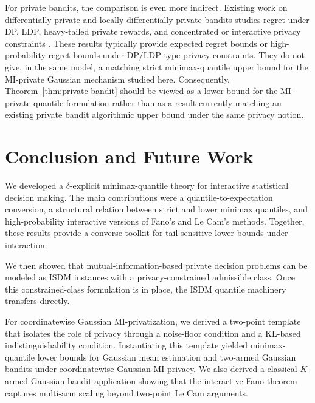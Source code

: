 \documentclass[journal]{IEEEtran}
\begin{document}
For private bandits, the comparison is even more indirect. Existing work on
differentially private and locally differentially private bandits studies regret
under DP, LDP, heavy-tailed private rewards, and
concentrated or interactive privacy constraints
\cite{tossou2016algorithms,basu2019differential,tao2022optimal,azize2024concentrated}.
These results typically provide expected regret bounds or 
high-probability regret bounds under DP/LDP-type privacy constraints. They do not
give, in the same model, a matching strict minimax-quantile upper bound for the
MI-private Gaussian mechanism studied here. Consequently,
Theorem~\ref{thm:private-bandit} should be viewed as a lower bound for the
MI-private quantile formulation rather than as a result currently matching an existing private bandit algorithmic upper bound under the same privacy notion.



%

\section{Conclusion and Future Work}
\label{sec:conclusion}

We developed a \(\delta\)-explicit minimax-quantile theory for interactive statistical decision making. The main contributions were a quantile-to-expectation conversion, a structural relation between strict and lower minimax quantiles, and high-probability interactive versions of Fano's and Le Cam's methods. Together, these results provide a converse toolkit for tail-sensitive lower bounds under interaction.

We then showed that mutual-information-based private decision problems can be modeled as ISDM instances with a privacy-constrained admissible class. Once this constrained-class formulation is in place, the ISDM quantile machinery transfers directly.

For coordinatewise Gaussian MI-privatization, we derived a two-point template that isolates the role of privacy through a noise-floor condition and a
KL-based indistinguishability condition. Instantiating this template yielded minimax-quantile lower bounds for Gaussian mean estimation and two-armed Gaussian bandits under coordinatewise Gaussian MI privacy. We also derived a
classical \(K\)-armed Gaussian bandit application showing that the interactive Fano theorem captures multi-arm scaling beyond two-point Le Cam
arguments.
\end{document}
